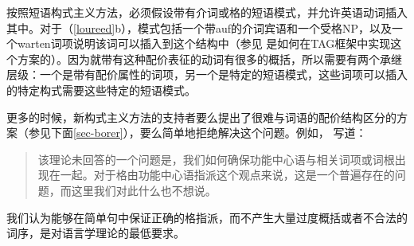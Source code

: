 \begin{exe}
\begin{xlist}[iv.]
\begin{exe}
\begin{xlist}[iv.]
按照短语构式主义方法，必须假设带有介词或格的短语模式，并允许英语动词插入其中。对于（\ref{loureed}b），模式包括一个带auf的介词宾语和一个受格NP，以及一个warten词项说明该词可以插入到这个结构中（参见 是如何在TAG框架中实现这个方案的）。因为就带有这种配价表征的动词有很多的概括，所以需要有两个承继层级：一个是带有配价属性的词项，另一个是特定的短语模式，这些词项可以插入的特定构式需要这些特定的短语模式。

更多的时候，新构式主义方法的支持者要么提出了很难与词语的配价结构区分的方案（参见下面\ref{sec-borer}），要么简单地拒绝解决这个问题。例如， \citet{Lohndal2012a}写道：
\begin{quotation}
该理论未回答的一个问题是，我们如何确保功能中心语与相关词项或词根出现在一起。对于格由功能中心语指派这个观点来说，这是一个普遍存在的问题，而这里我们对此什么也不想说。\citep{Lohndal2012a}
\end{quotation}
我们认为能够在简单句中保证正确的格指派，而不产生大量过度概括或者不合法的词序，是对语言学理论的最低要求。


\end{xlist}
\end{exe}
\end{xlist}
\end{exe}
